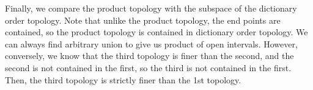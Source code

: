 \documentclass[12pt]{article}
\newenvironment{solution}[1][Solution]
{
	\begin{trivlist} 
		\item[\hskip \labelsep {\itshape #1:}]
	}
	{
	\end{trivlist}
}
\begin{document}
\begin{solution}
	\par Finally, we compare the product topology with the subspace of the dictionary order topology. Note that unlike the product topology, the end points are contained, so the product topology is contained in dictionary order topology. We can always find arbitrary union to give us product of open intervals. However, conversely, we know that the third topology is finer than the second, and the second is not contained in the first, so the third is not contained in the first. Then, the third topology is strictly finer than the 1st topology. 
\label{key}				
\end{solution}
\end{document}
